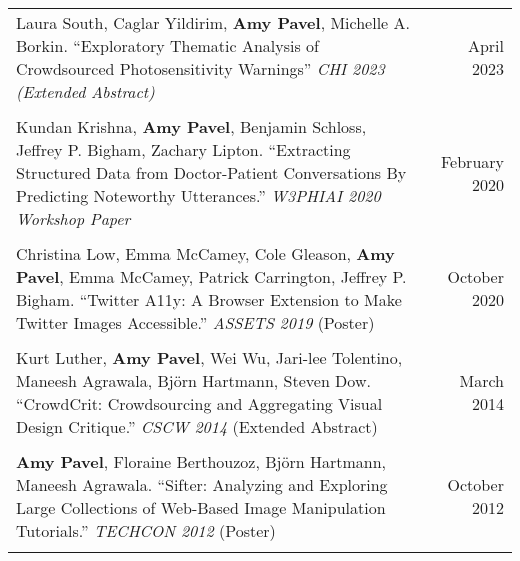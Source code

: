 \begin{longtable}{Xr}
	Laura South, Caglar Yildirim, \textbf{Amy Pavel}, Michelle A. Borkin. ``Exploratory Thematic Analysis of Crowdsourced Photosensitivity Warnings'' \textit{CHI 2023 (Extended Abstract)} & April 2023 \\
	\\

	Kundan Krishna, \textbf{Amy Pavel}, Benjamin Schloss, Jeffrey P. Bigham, Zachary Lipton. ``Extracting Structured Data from Doctor-Patient Conversations By Predicting Noteworthy Utterances.'' \textit{W3PHIAI 2020 Workshop Paper} & February 2020 \\
	\\

	Christina Low, Emma McCamey, Cole Gleason, \textbf{Amy Pavel}, Emma McCamey, Patrick Carrington, Jeffrey P. Bigham. ``Twitter A11y: A Browser Extension to Make Twitter Images Accessible.'' \textit{ASSETS 2019} (Poster) & October 2020 \\
	\\

	Kurt Luther, \textbf{Amy Pavel}, Wei Wu, Jari-lee Tolentino, Maneesh Agrawala, Björn Hartmann, Steven Dow. ``CrowdCrit: Crowdsourcing and Aggregating Visual Design Critique.'' \textit{CSCW 2014} (Extended Abstract) & March 2014 \\
	\\

	\textbf{Amy Pavel}, Floraine Berthouzoz, Björn Hartmann, Maneesh Agrawala. ``Sifter: Analyzing and Exploring Large Collections of Web-Based Image Manipulation Tutorials.'' \textit{TECHCON 2012} (Poster) & October 2012 \\
	\\

\end{longtable}